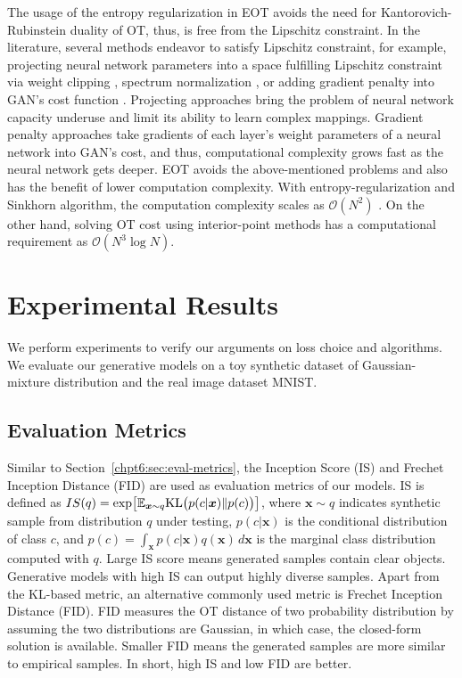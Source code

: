 \begin{remark}

The usage of the entropy regularization in EOT avoids the need for Kantorovich-Rubinstein duality
of OT, thus, is free from the Lipschitz constraint. In the literature, several methods endeavor to
satisfy Lipschitz constraint, for example, projecting neural network
parameters into a space fulfilling Lipschitz constraint via weight
clipping \cite{2017arXiv170107875A}, spectrum
normalization \cite{2018arXiv180205957M}, or adding gradient 
penalty into GAN's cost function \cite{2017arXiv170400028G}. Projecting
approaches bring the problem of neural network capacity underuse and
limit its ability to learn complex mappings. Gradient penalty approaches take
gradients of each layer's weight parameters of a neural network into
GAN's cost, and thus, computational complexity grows fast as the neural
network gets deeper. 
EOT avoids the above-mentioned problems and also has the benefit of lower
computation complexity. With entropy-regularization and Sinkhorn
algorithm, the computation complexity scales as $\mathcal{O}(N^2)$ \cite{2013arXiv1306.0895C}. 
On the other hand, solving OT cost using interior-point methods has a computational requirement as 
$\mathcal{O}(N^3\log{N})$. 

\end{remark}

\section{Experimental Results}
We perform experiments to verify our arguments on loss choice and algorithms. We evaluate our
generative models on a toy synthetic dataset of Gaussian-mixture distribution and the real image dataset MNIST.

\subsection{Evaluation Metrics}\label{subsec-metric}
Similar to Section~\ref{chpt6:sec:eval-metrics}, the Inception Score (IS) \cite{NIPS2016_6125} and Frechet Inception Distance (FID)\cite{2017arXiv170608500H} are used as evaluation metrics of our models. IS is defined as $
  IS(q) = \exp\bigl[ \mathbb{E}_{\bm{x} \sim q} \mathrm{KL}\bigl( p(c | \bm{x})\| p(c) \bigr)  \bigr]$,
where $\bm{x}\sim q$ indicates synthetic sample from distribution $q$ under testing, $p(c|\bm{x})$ is the conditional distribution of class $c$, and $p(c) = \int_{\bm{x}}p(c|\bm{x})q(\bm{x}) \,d \bm{x} $ is the marginal class distribution computed with $q$. Large IS score means generated samples contain clear objects. Generative models with high IS can output highly diverse samples. Apart from the KL-based metric, an alternative commonly used metric is Frechet Inception Distance (FID)\cite{2017arXiv170608500H}. FID measures the OT distance of two probability distribution by assuming the two distributions are Gaussian, in which case, the closed-form solution is available. Smaller FID means the generated samples are more similar to empirical samples. In short, high IS and low FID are better.


